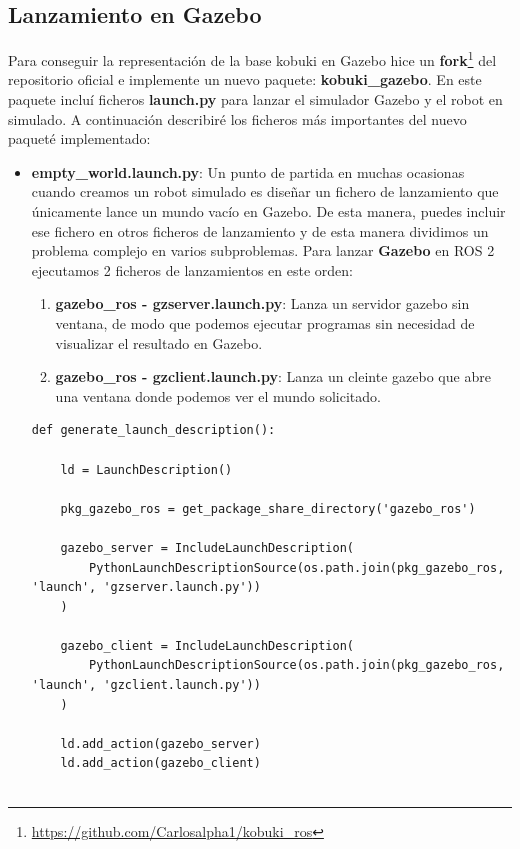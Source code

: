 \subsection{Lanzamiento en Gazebo}
\label{sec:kobuki_gazebo}

Para conseguir la representación de la base kobuki en Gazebo hice un \textbf{fork}\footnote{\url{https://github.com/Carlosalpha1/kobuki_ros}} del repositorio oficial e implemente un nuevo paquete: \textbf{kobuki\_gazebo}. En este paquete incluí ficheros \textbf{launch.py} para lanzar el simulador Gazebo y el robot en simulado. A continuación describiré los ficheros más importantes del nuevo paqueté implementado:

\begin{itemize}
	\item \textbf{empty\_world.launch.py}: Un punto de partida en muchas ocasionas cuando creamos un robot simulado es diseñar un fichero de lanzamiento que únicamente lance un mundo vacío en Gazebo. De esta manera, puedes incluir ese fichero en otros ficheros de lanzamiento y de esta manera dividimos un problema complejo en varios subproblemas. Para lanzar \textbf{Gazebo} en ROS 2 ejecutamos 2 ficheros de lanzamientos en este orden:
	\begin{enumerate}
		\item \textbf{gazebo\_ros - gzserver.launch.py}: Lanza un servidor gazebo sin ventana, de modo que podemos ejecutar programas sin necesidad de visualizar el resultado en Gazebo.
		\item \textbf{gazebo\_ros - gzclient.launch.py}: Lanza un cleinte gazebo que abre una ventana donde podemos ver el mundo solicitado.
	\end{enumerate}
	
	\cleardoublepage
\begin{code}[H]
\begin{lstlisting}[frame=single]
def generate_launch_description():

	ld = LaunchDescription()

	pkg_gazebo_ros = get_package_share_directory('gazebo_ros')
		
	gazebo_server = IncludeLaunchDescription(
		PythonLaunchDescriptionSource(os.path.join(pkg_gazebo_ros, 'launch', 'gzserver.launch.py'))
	)
		
	gazebo_client = IncludeLaunchDescription(
		PythonLaunchDescriptionSource(os.path.join(pkg_gazebo_ros, 'launch', 'gzclient.launch.py'))
	)
	
	ld.add_action(gazebo_server)
	ld.add_action(gazebo_client)
	

\end{lstlisting}
\end{code}
\end{itemize}
